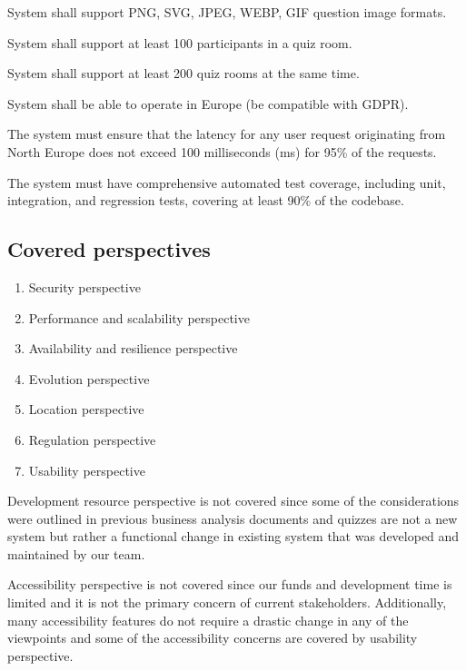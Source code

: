 \begin{nfrlist}
    \item System shall support PNG, SVG, JPEG, WEBP, GIF question image formats.
    \item System shall support at least 100 participants in a quiz room.
    \item System shall support at least 200 quiz rooms at the same time.
    \item System shall be able to operate in Europe (be compatible with GDPR).
    \item The system must ensure that the latency for any user request originating from North Europe does not exceed 100 milliseconds (ms) for 95\% of the requests.
    \item The system must have comprehensive automated test coverage, including unit, integration, and regression tests, covering at least 90\% of the codebase.

\end{nfrlist}

\subsection{Covered perspectives}

\begin{enumerate}
    \item Security perspective
    \item Performance and scalability perspective
    \item Availability and resilience perspective
    \item Evolution perspective
    \item Location perspective
    \item Regulation perspective
    \item Usability perspective
\end{enumerate}

Development resource perspective is not covered since some of the considerations were outlined in previous business analysis documents and quizzes are not a new system but rather a functional change in existing system that was developed and maintained by our team.

Accessibility perspective is not covered since our funds and development time is limited and it is not the primary concern of current stakeholders. Additionally, many accessibility features do not require a drastic change in any of the viewpoints and some of the accessibility concerns are covered by usability perspective.

